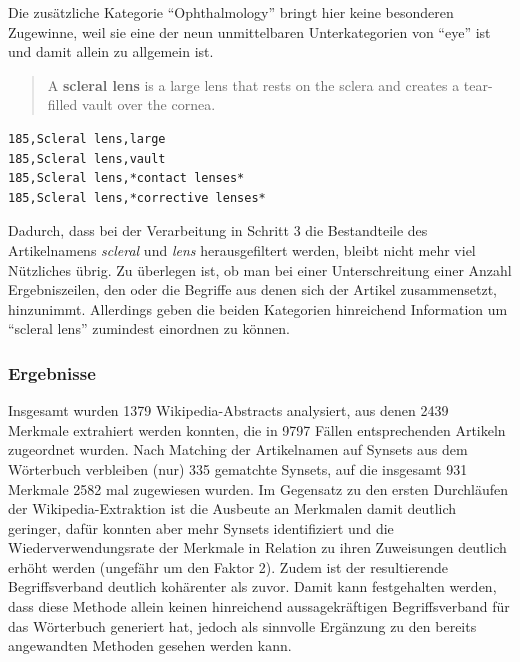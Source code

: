 \documentclass[pagesize,paper=A4,DIV=calc,fontsize=12pt,draft=false]{scrreprt}
\begin{document}
Die zusätzliche Kategorie \enquote{Ophthalmology} bringt hier keine besonderen Zugewinne, weil sie eine der neun unmittelbaren Unterkategorien von \enquote{eye} ist und damit allein zu allgemein ist.

\begin{quote}
A \textbf{scleral lens} is a large lens that rests on the sclera and creates a tear-filled vault over the cornea.
\end{quote}

\lstset{
language=Bash,
}

\begin{lstlisting}[caption={Beispiel für eine Ergebnisliste nach Filterung mit Wortartenerkennung. Die in Sternen eingefassten Wörter sind Kategorien.}]
185,Scleral lens,large 
185,Scleral lens,vault 
185,Scleral lens,*contact lenses* 
185,Scleral lens,*corrective lenses*
\end{lstlisting}

Dadurch, dass bei der Verarbeitung in Schritt 3 die Bestandteile des Artikelnamens \textit{scleral} und \textit{lens} herausgefiltert werden, bleibt nicht mehr viel Nützliches übrig. 
Zu überlegen ist, ob man bei einer Unterschreitung einer Anzahl Ergebniszeilen, den oder die Begriffe aus denen sich der Artikel zusammensetzt, hinzunimmt. 
Allerdings geben die beiden Kategorien hinreichend Information um \enquote{scleral lens} zumindest einordnen zu können. 

\subsubsection{Ergebnisse}

Insgesamt wurden 1379 Wikipedia-Abstracts analysiert, aus denen 2439 Merkmale extrahiert werden konnten, die in 9797 Fällen entsprechenden Artikeln zugeordnet wurden. 
Nach Matching der Artikelnamen auf Synsets aus dem Wörterbuch verbleiben (nur) 335 gematchte Synsets, auf die insgesamt 931 Merkmale 2582 mal zugewiesen wurden. 
Im Gegensatz zu den ersten Durchläufen der Wikipedia-Extraktion ist die Ausbeute an Merkmalen damit deutlich geringer, dafür konnten aber mehr Synsets identifiziert und die Wiederverwendungsrate der Merkmale in Relation zu ihren Zuweisungen deutlich erhöht werden (ungefähr um den Faktor 2). 
Zudem ist der resultierende Begriffsverband deutlich kohärenter als zuvor. 
Damit kann festgehalten werden, dass diese Methode allein keinen hinreichend aussagekräftigen Begriffsverband für das Wörterbuch generiert hat, jedoch als sinnvolle Ergänzung zu den bereits angewandten Methoden gesehen werden kann. 
\end{document}
